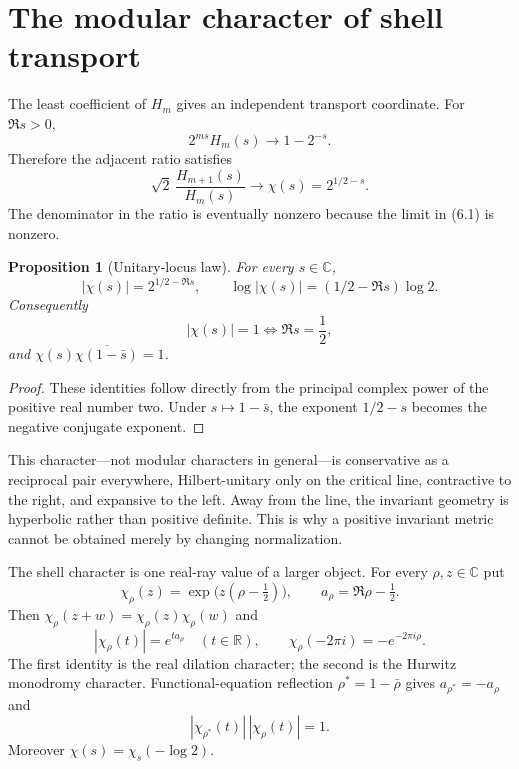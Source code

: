\documentclass[11pt]{article}
\newtheorem{proposition}[theorem]{Proposition}
\theoremstyle{definition}
\theoremstyle{remark}
\newcommand{\C}{\mathbb C}
\newcommand{\R}{\mathbb R}
\begin{document}
\section{The modular character of shell transport}

The least coefficient of $H_m$ gives an independent transport coordinate.  For $\Re s>0$,
\[
 2^{ms}H_m(s)\longrightarrow1-2^{-s}.
 \tag{6.1}
\]
Therefore the adjacent ratio satisfies
\[
 \sqrt2\,\frac{H_{m+1}(s)}{H_m(s)}\longrightarrow
 \chi(s)=2^{1/2-s}.
 \tag{6.2}
\]
The denominator in the ratio is eventually nonzero because the limit in (6.1) is nonzero.

\begin{proposition}[Unitary-locus law]\label{prop:unitary}
For every $s\in\C$,
\[
 |\chi(s)|=2^{1/2-\Re s},\qquad
 \log|\chi(s)|=(1/2-\Re s)\log2.
 \tag{6.3}
\]
Consequently
\[
 |\chi(s)|=1\iff\Re s=\frac12,
 \tag{6.4}
\]
and $\chi(s)\overline{\chi(1-\bar s)}=1$.
\end{proposition}

\begin{proof}
These identities follow directly from the principal complex power of the positive real number
two.  Under $s\mapsto1-\bar s$, the exponent $1/2-s$ becomes the negative conjugate exponent.
\end{proof}

This character---not modular characters in general---is conservative as a reciprocal pair
everywhere, Hilbert-unitary only
on the critical line, contractive to the right, and expansive to the left.  Away from the line,
the invariant geometry is hyperbolic rather than positive definite.  This is why a positive
invariant metric cannot be obtained merely by changing normalization.

The shell character is one real-ray value of a larger object.  For every $\rho,z\in\C$ put
\[
 \chi_\rho(z)=\exp\!\bigl(z(\rho-\tfrac12)\bigr),\qquad
 a_\rho=\Re\rho-\tfrac12.
 \tag{6.5}
\]
Then $\chi_\rho(z+w)=\chi_\rho(z)\chi_\rho(w)$ and
\[
 |\chi_\rho(t)|=e^{t a_\rho}\quad(t\in\R),\qquad
 \chi_\rho(-2\pi i)=-e^{-2\pi i\rho}.
 \tag{6.6}
\]
The first identity is the real dilation character; the second is the Hurwitz monodromy
character.  Functional-equation reflection $\rho^\ast=1-\bar\rho$ gives
$a_{\rho^\ast}=-a_\rho$ and
\[
 |\chi_{\rho^\ast}(t)|\,|\chi_\rho(t)|=1.
 \tag{6.7}
\]
Moreover $\chi(s)=\chi_s(-\log2)$.
\end{document}
